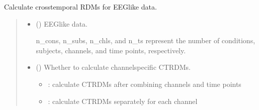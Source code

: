 \documentclass[letterpaper,10pt,english]{sphinxhowto}
\begin{document}
\begin{fulllineitems}
\label{\detokenize{ctrdm_cal:neurora.ctrdm_cal.ctRDM}}
\pysigstartsignatures
{}
\pysigstopsignatures
\sphinxAtStartPar
Calculate cross\sphinxhyphen{}temporal RDMs for EEG\sphinxhyphen{}like data.
\begin{quote}\begin{description}
\begin{itemize}
\item {} 
\sphinxAtStartPar
{} (\sphinxstyleliteralemphasis{\sphinxupquote{, }}\sphinxstyleliteralemphasis{\sphinxupquote{ {[}}}\sphinxstyleliteralemphasis{\sphinxupquote{, }}\sphinxstyleliteralemphasis{\sphinxupquote{, }}\sphinxstyleliteralemphasis{\sphinxupquote{, }}\sphinxstyleliteralemphasis{\sphinxupquote{{]}}}) \textendash{} 
\sphinxAtStartPar
EEG\sphinxhyphen{}like data.

\sphinxAtStartPar
n\_cons, n\_subs, n\_chls, and n\_ts represent the number of conditions,
subjects, channels, and time points, respectively.


\item {} 
\sphinxAtStartPar
{} (\sphinxstyleliteralemphasis{\sphinxupquote{, }}) \textendash{} 
\sphinxAtStartPar
Whether to calculate channel\sphinxhyphen{}specific CTRDMs.
\begin{itemize}
\item {} 
 : calculate CTRDMs after combining channels and time points

\item {} 
 : calculate CTRDMs separately for each channel


\end{itemize}
\end{itemize}
\end{description}
\end{quote}
\end{fulllineitems}
\end{document}
